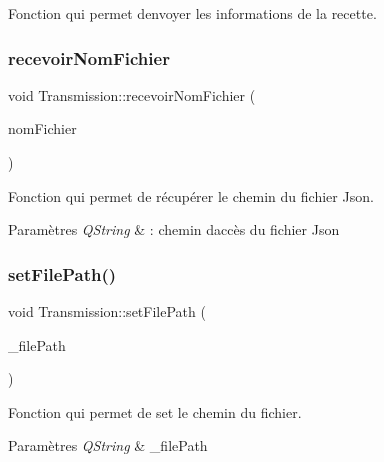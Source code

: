 Fonction qui permet d\textquotesingle{}envoyer les informations de la recette. 

\mbox{\label{classTransmission_aa442272a44f095192da5b0bf92a5bb06}} 
\subsubsection{\texorpdfstring{recevoir\+Nom\+Fichier}{recevoirNomFichier}}
{\footnotesize\ttfamily void Transmission\+::recevoir\+Nom\+Fichier (\begin{DoxyParamCaption}\item[{Q\+String}]{nom\+Fichier }\end{DoxyParamCaption})\hspace{0.3cm}{\ttfamily [slot]}}



Fonction qui permet de récupérer le chemin du fichier Json. 


\begin{DoxyParams}{Paramètres}
{\em Q\+String} & \+: chemin d\textquotesingle{}accès du fichier Json \\
\hline
\end{DoxyParams}
\mbox{\label{classTransmission_a5099a8d2ae60a2f159230bf81bafebdc}} 
\subsubsection{\texorpdfstring{set\+File\+Path()}{setFilePath()}}
{\footnotesize\ttfamily void Transmission\+::set\+File\+Path (\begin{DoxyParamCaption}\item[{Q\+String}]{\+\_\+file\+Path }\end{DoxyParamCaption})\hspace{0.3cm}{\ttfamily [inline]}}



Fonction qui permet de set le chemin du fichier. 


\begin{DoxyParams}{Paramètres}
{\em Q\+String} & \+\_\+file\+Path \\
\hline
\end{DoxyParams}


